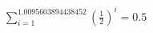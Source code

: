\documentclass[preview]{standalone}
\begin{document}
\begin{align*}
\sum_{i=1}^{1.0095603894438452} (\frac{1}{2})^i = {0.5}
\end{align*}
\end{document}

